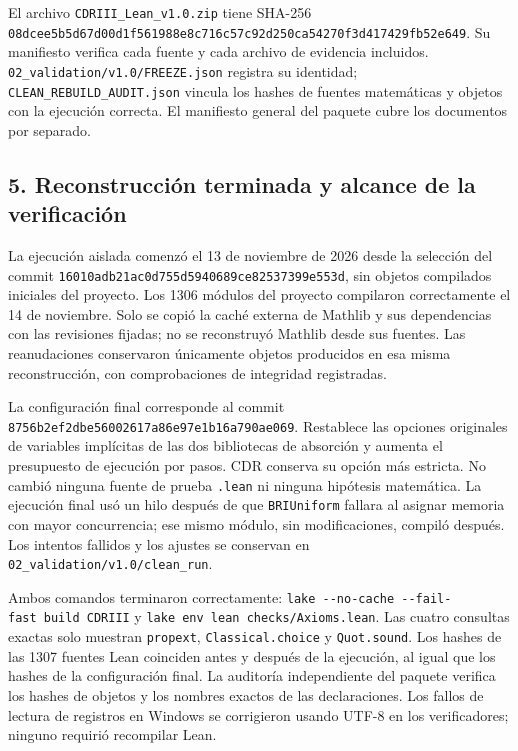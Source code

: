 \documentclass[spanish,11pt,a4paper]{article}
\begin{document}
El archivo \texttt{CDRIII\_\allowbreak{}Lean\_\allowbreak{}v1.\allowbreak{}0.\allowbreak{}zip} tiene SHA-256 \texttt{08dcee5b\allowbreak{}5d67d00d\allowbreak{}1f561988\allowbreak{}e8c716c5\allowbreak{}7c92d250\allowbreak{}ca54270f\allowbreak{}3d417429\allowbreak{}fb52e649}. Su manifiesto verifica cada fuente y cada archivo de evidencia incluidos. \texttt{02\_\allowbreak{}validation/\allowbreak{}v1.\allowbreak{}0/\allowbreak{}FREEZE.\allowbreak{}json} registra su identidad; \texttt{CLEAN\_\allowbreak{}REBUILD\_\allowbreak{}AUDIT.\allowbreak{}json} vincula los hashes de fuentes matemáticas y objetos con la ejecución correcta. El manifiesto general del paquete cubre los documentos por separado.

\subsection{5. Reconstrucción terminada y alcance de la verificación}\label{reconstrucciuxf3n-terminada-y-alcance-de-la-verificaciuxf3n}

La ejecución aislada comenzó el 13 de noviembre de 2026 desde la selección del commit \texttt{16010adb\allowbreak{}21ac0d75\allowbreak{}5d594068\allowbreak{}9ce82537\allowbreak{}399e553d}, sin objetos compilados iniciales del proyecto. Los 1306 módulos del proyecto compilaron correctamente el 14 de noviembre. Solo se copió la caché externa de Mathlib y sus dependencias con las revisiones fijadas; no se reconstruyó Mathlib desde sus fuentes. Las reanudaciones conservaron únicamente objetos producidos en esa misma reconstrucción, con comprobaciones de integridad registradas.

La configuración final corresponde al commit \texttt{8756b2ef\allowbreak{}2dbe5600\allowbreak{}2617a86e\allowbreak{}97e1b16a\allowbreak{}790ae069}. Restablece las opciones originales de variables implícitas de las dos bibliotecas de absorción y aumenta el presupuesto de ejecución por pasos. CDR conserva su opción más estricta. No cambió ninguna fuente de prueba \texttt{.\allowbreak{}lean} ni ninguna hipótesis matemática. La ejecución final usó un hilo después de que \texttt{BRIUniform} fallara al asignar memoria con mayor concurrencia; ese mismo módulo, sin modificaciones, compiló después. Los intentos fallidos y los ajustes se conservan en \texttt{02\_\allowbreak{}validation/\allowbreak{}v1.\allowbreak{}0/\allowbreak{}clean\_\allowbreak{}run}.

Ambos comandos terminaron correctamente: \texttt{lake\ -\/\allowbreak{}-no-cache\ -\/\allowbreak{}-fail-fast\ build\ CDRIII} y \texttt{lake\ env\ lean\ checks/\allowbreak{}Axioms.\allowbreak{}lean}. Las cuatro consultas exactas solo muestran \texttt{propext}, \texttt{Classical.\allowbreak{}choice} y \texttt{Quot.\allowbreak{}sound}. Los hashes de las 1307 fuentes Lean coinciden antes y después de la ejecución, al igual que los hashes de la configuración final. La auditoría independiente del paquete verifica los hashes de objetos y los nombres exactos de las declaraciones. Los fallos de lectura de registros en Windows se corrigieron usando UTF-8 en los verificadores; ninguno requirió recompilar Lean.
\end{document}
